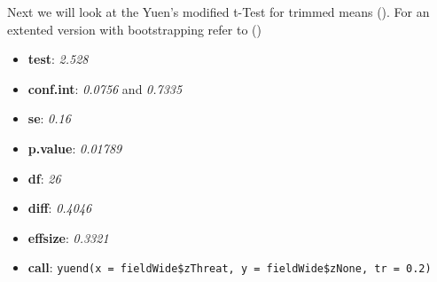 \documentclass[
]{article}
\newenvironment{Shaded}{\begin{snugshade}}{\end{snugshade}}
\newcommand{\AttributeTok}[1]{\textcolor[rgb]{0.13,0.29,0.53}{#1}}
\newcommand{\DecValTok}[1]{\textcolor[rgb]{0.00,0.00,0.81}{#1}}
\newcommand{\FloatTok}[1]{\textcolor[rgb]{0.00,0.00,0.81}{#1}}
\newcommand{\FunctionTok}[1]{\textcolor[rgb]{0.13,0.29,0.53}{\textbf{#1}}}
\newcommand{\NormalTok}[1]{#1}
\newcommand{\SpecialCharTok}[1]{\textcolor[rgb]{0.81,0.36,0.00}{\textbf{#1}}}
\providecommand{\tightlist}{%
  \setlength{\itemsep}{0pt}\setlength{\parskip}{0pt}}
\begin{document}
Next we will look at the Yuen's modified t-Test for trimmed means (). For an extented version with bootstrapping refer to ()

\begin{Shaded}
\end{Shaded}

\begin{itemize}
\tightlist
\item
  \textbf{test}: \emph{2.528}
\item
  \textbf{conf.int}: \emph{0.0756} and \emph{0.7335}
\item
  \textbf{se}: \emph{0.16}
\item
  \textbf{p.value}: \emph{0.01789}
\item
  \textbf{df}: \emph{26}
\item
  \textbf{diff}: \emph{0.4046}
\item
  \textbf{effsize}: \emph{0.3321}
\item
  \textbf{call}: \texttt{yuend(x\ =\ fieldWide\$zThreat,\ y\ =\ fieldWide\$zNone,\ tr\ =\ 0.2)}
\end{itemize}

\begin{Shaded}
\end{Shaded}
\end{document}
